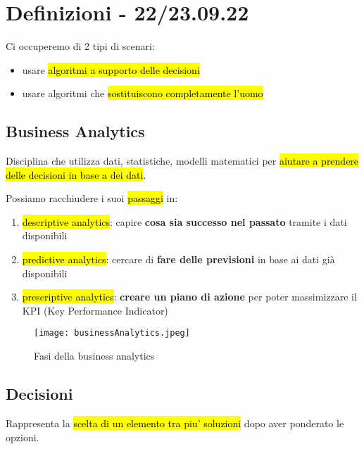 \newpage
\section{Definizioni - 22/23.09.22}

Ci occuperemo di 2 tipi di scenari:
\begin{itemize}
	\item usare \hl{algoritmi a supporto delle decisioni}
	\item usare algoritmi che \hl{sostituiscono completamente l'uomo}
\end{itemize}


\subsection{Business Analytics}

Disciplina che utilizza dati, statistiche, modelli matematici per \hl{aiutare a prendere delle decisioni in base a dei dati}.

Possiamo racchiudere i suoi \hl{passaggi} in:
\begin{enumerate}
	\item \hl{descriptive analytics}: capire \textbf{cosa sia successo nel passato} tramite i dati disponibili
	\item \hl{predictive analytics}: cercare di \textbf{fare delle previsioni} in base ai dati già disponibili
	\item \hl{prescriptive analytics}: \textbf{creare un piano di azione} per poter massimizzare il KPI (Key Performance Indicator)
\end{enumerate}

\begin{figure}[H]
\centering
\texttt{[image: businessAnalytics.jpeg]}
\caption{Fasi della business analytics} 
\label{busana}
\end{figure}


\subsection{Decisioni}

Rappresenta la \hl{scelta di un elemento tra piu' soluzioni} dopo aver ponderato le opzioni.

